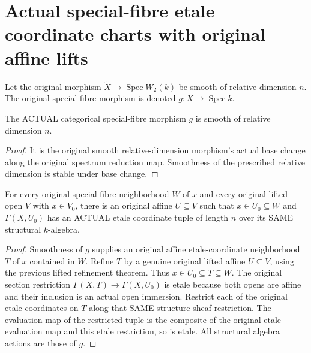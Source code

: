 \section{Actual special-fibre etale coordinate charts with original affine lifts}
\label{sec:witt-two-special-fibre-etale-basis}

Let the original morphism $\widetilde X\to\operatorname{Spec}W_2(k)$
be smooth of relative dimension $n$. The original special-fibre
morphism is denoted $g:X\to\operatorname{Spec}k$.

\begin{theorem}
\label{thm:witt-two-special-fibre-smooth-relative-dimension}
\leanok
The ACTUAL categorical special-fibre morphism $g$ is smooth of
relative dimension $n$.
\end{theorem}
\begin{proof}
It is the original smooth relative-dimension morphism's actual
base change along the original spectrum reduction map. Smoothness
of the prescribed relative dimension is stable under base change.
\end{proof}

\begin{theorem}
\label{thm:witt-two-special-fibre-lifted-etale-refinement}
\leanok
For every original special-fibre neighborhood $W$ of $x$ and every
original lifted open $V$ with $x\in V_0$, there is an original
affine $U\subseteq V$ such that $x\in U_0\subseteq W$ and
$\Gamma(X,U_0)$ has an ACTUAL etale coordinate tuple of length $n$
over its SAME structural $k$-algebra.
\end{theorem}
\begin{proof}
Smoothness of $g$ supplies an original affine etale-coordinate
neighborhood $T$ of $x$ contained in $W$. Refine $T$ by a genuine
original lifted affine $U\subseteq V$, using the previous lifted
refinement theorem. Thus $x\in U_0\subseteq T\subseteq W$.
The original section restriction $\Gamma(X,T)\to\Gamma(X,U_0)$
is etale because both opens are affine and their inclusion is an
actual open immersion. Restrict each of the original etale
coordinates on $T$ along that SAME structure-sheaf restriction.
The evaluation map of the restricted tuple is the composite of
the original etale evaluation map and this etale restriction,
so is etale. All structural algebra actions are those of $g$.
\end{proof}

